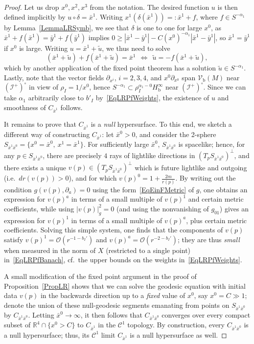 \documentclass[reqno,11pt,letterpaper]{amsart}
\numberwithin{equation}{section}
\numberwithin{figure}{section}
\theoremstyle{definition}
\theoremstyle{remark}
\newcommand{\mc}{\mathcal}
\newcommand{\cC}{\mc C}
\newcommand{\cO}{\mc O}
\newcommand{\ms}{\mathscr}
\newcommand{\scri}{\ms I}
\newcommand{\R}{\mathbb{R}}
\newcommand{\Llra}{\Longleftrightarrow}
\newcommand{\pa}{\partial}
\newcommand{\wt}{\widetilde}
\newcommand{\bop}{{\mathrm{b}}}
\newcommand{\Vf}{\mathcal V}
\newcommand{\Vb}{\Vf_\bop}
\newcommand{\Hb}{H_{\bop}}
\begin{document}
\begin{proof}
  Let us drop $x^0,x^2,x^3$ from the notation. The desired function $u$ is then defined implicitly by $u\circ\delta=\bar x^1$. Writing $x^1(\delta(\bar x^1))=:\bar x^1+f$, where $f\in S^{-\alpha_1}$ by Lemma~\ref{LemmaLRSymb}, we see that $\delta$ is one to one for large $x^0$, as $\bar x^1+f(\bar x^1)=\bar y^1+f(\bar y^1)$ implies $0\geq|\bar x^1-\bar y^1|-C(x^0)^{-\alpha_1}|\bar x^1-\bar y^1|$, so $\bar x^1=\bar y^1$ if $x^0$ is large. Writing $u=\bar x^1+\wt u$, we thus need to solve
  \[
    (\bar x^1+\wt u)+f(\bar x^1+\wt u)=\bar x^1\ \ \Llra\ \ 
    \wt u = -f(\bar x^1+\wt u),
  \]
  which by another application of the fixed point theorem has a solution $\wt u\in S^{-\alpha_1}$. Lastly, note that the vector fields $\pa_{x^i}$, $i=2,3,4$, and $x^0\pa_{x^0}$ span $\Vb(M)$ near $(\scri^+)^\circ$ in view of $\rho_I=1/x^0$, hence $S^{-\alpha_1}\subset\rho_I^{\alpha_1-0}\Hb^\infty$ near $(\scri^+)^\circ$. Since we can take $\alpha_1$ arbitrarily close to $b'_I$ by~\eqref{EqLRPfWeights}, the existence of $u$ and smoothness of $C_{\bar x^1}$ follows.

  It remains to prove that $C_{\bar x^1}$ is a \emph{null} hypersurface. To this end, we sketch a different way of constructing $C_{\bar x^1}$: let $\bar x^0>0$, and consider the 2-sphere $S_{\bar x^1\bar x^0}=\{x^0=\bar x^0,\ x^1=\bar x^1\}$. For sufficiently large $\bar x^0$, $S_{\bar x^1\bar x^0}$ is spacelike; hence, for any $p\in S_{\bar x^1\bar x^0}$, there are precisely $4$ rays of lightlike directions in $(T_p S_{\bar x^1\bar x^0})^\perp$, and there exists a unique $v(p)\in(T_p S_{\bar x^1\bar x^0})^\perp$ which is future lightlike and outgoing (i.e.\ $d r(v(p))>0$), and for which $v(p)^0=1+\frac{2 m}{r(p)}$. By writing out the condition $g(v(p),\pa_a)=0$ using the form~\eqref{EqEinFMetric} of $g$, one obtains an expression for $v(p)^a$ in terms of a small multiple of $v(p)^1$ and certain metric coefficients, while using $|v(p)|_g^2=0$ (and using the nonvanishing of $g_{0 1}$) gives an expression for $v(p)^1$ in terms of a small multiple of $v(p)^a$, plus certain metric coefficients. Solving this simple system, one finds that the components of $v(p)$ satisfy $v(p)^1=\cO(r^{-1-b_I'})$ and $v(p)^a=\cO(r^{-2-b_I'})$; they are thus \emph{small} when measured in the norm of $X$ (restricted to a single point) in~\eqref{EqLRPfBanach}, cf.\ the upper bounds on the weights in~\eqref{EqLRPfWeights}.
  
  A small modification of the fixed point argument in the proof of Proposition~\ref{PropLR} shows that we can solve the geodesic equation with initial data $v(p)$ in the backwards direction up to a \emph{fixed} value of $x^0$, say $x^0=C\gg 1$; denote the union of these null-geodesic segments emanating from points on $S_{\bar x^1\bar x^0}$ by $C_{\bar x^1\bar x^0}$. Letting $\bar x^0\to\infty$, it then follows that $C_{\bar x^1\bar x^0}$ converges over every compact subset of $\R^4\cap\{x^0>C\}$ to $C_{\bar x^1}$ in the $\cC^1$ topology. By construction, every $C_{\bar x^1\bar x^0}$ is a null hypersurface; thus, its $\cC^1$ limit $C_{\bar x^1}$ is a null hypersurface as well.
\end{proof}
\end{document}
